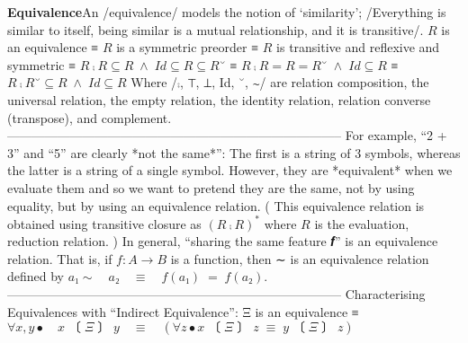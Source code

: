 \documentclass[11pt]{article}
\begin{document}
\vspace{1em}\textbf{Equivalence}\quad\label{org-special-block-extras-glossary-Equivalence}An /equivalence/ models the notion of ‘similarity’; /Everything is similar to itself, being similar is a mutual relationship, and it is transitive/.   \quad  $R$ is an equivalence ≡ \quad $R$ is a symmetric preorder ≡ \quad $R$ is transitive and reflexive and symmetric ≡ \quad $R ⨾ R ⊆ R \;∧\; Id ⊆ R ⊆ R˘$ ≡ \quad $R ⨾ R = R = R˘ \;∧\; Id ⊆ R$ ≡ \quad $R ⨾ R ˘ ⊆ R \;∧\; Id ⊆ R$  Where /⨾, ⊤, ⊥, Id, ˘, ∼/ are relation composition, the universal relation, the empty relation, the identity relation, relation converse (transpose), and complement. -------------------------------------------------------------------------------- For example, “2 + 3” and “5” are clearly *not the same*”: The first is a string of 3 symbols, whereas the latter is a string of a single symbol. \quad However, they are *equivalent* when we evaluate them and so we want to pretend they are the same, not by using equality, but by using an equivalence relation. \quad ( This equivalence relation is obtained using transitive closure as $(R ⨾ R)^*$ where $R$ is the evaluation, reduction relation. )  In general, “sharing the same feature 𝒇” is an equivalence relation. That is, if $f : A → B$ is a function, then ∼ is an equivalence relation defined by $a₁ ∼ \quad a₂ \quad≡\quad f(a₁) \;=\; f(a₂)$. -------------------------------------------------------------------------------- Characterising Equivalences with “Indirect Equivalence”: Ξ is an equivalence \quad ≡ \quad $∀ x, y • \quad x 〔Ξ〕 y \quad≡\quad (∀ z • x 〔Ξ〕 z \;≡\; y 〔Ξ〕 z)$ 
\end{document}
